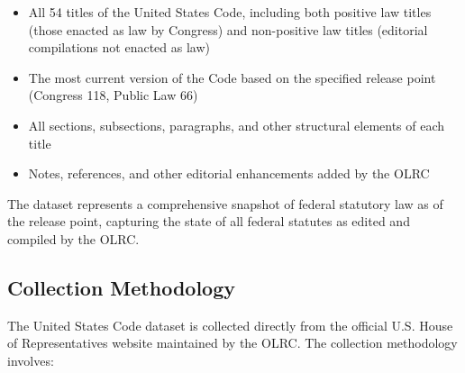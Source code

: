 \begin{itemize}
  \item All 54 titles of the United States Code, including both positive law titles (those enacted as law by Congress) and non-positive law titles (editorial compilations not enacted as law)
  
  \item The most current version of the Code based on the specified release point (Congress 118, Public Law 66)
  
  \item All sections, subsections, paragraphs, and other structural elements of each title
  
  \item Notes, references, and other editorial enhancements added by the OLRC
\end{itemize}

The dataset represents a comprehensive snapshot of federal statutory law as of the release point, capturing the state of all federal statutes as edited and compiled by the OLRC.

\subsection{Collection Methodology}

The United States Code dataset is collected directly from the official U.S. House of Representatives website maintained by the OLRC. The collection methodology involves:

